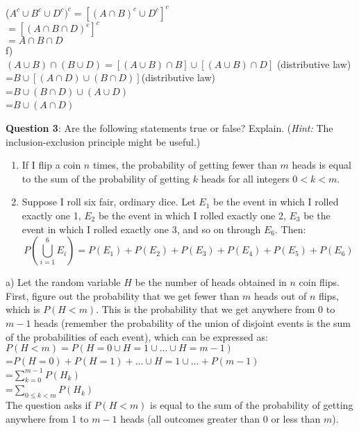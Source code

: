 \documentclass[12pt]{article}
\begin{document}
($A^c \cup B^c \cup D^c)^c = [(A \cap B)^c \cup D^c]^c$\\
$= [(A \cap B \cap D)^c]^c$\\
$= A \cap B \cap D$\\

  f)\\
$(A \cup B) \cap(B \cup D)  = [(A \cup B) \cap B] \cup [(A \cup B) \cap D]$ (distributive law) \\
=$B \cup [(A \cap D) \cup (B\cap D)]$(distributive law) \\
=$B \cup (B \cap D) \cup (A\cup D)$ \\
=$B \cup (A \cap D)$ \\

\medskip

\noindent \textbf{Question 3}: Are the following statements true or false? Explain. (\textit{Hint:} The inclusion-exclusion principle might be useful.)
\begin{enumerate}
\item If I flip a coin $n$ times, the probability of getting fewer than $m$ heads is equal to the sum of the probability of getting $k$ heads for all integers $0 < k < m$.
\item Suppose I roll six fair, ordinary dice. Let $E_1$ be the event in which I rolled exactly one 1, $E_2$ be the event in which I rolled exactly one 2, $E_3$ be the event in which I rolled exactly one 3, and so on through $E_6$. Then: $$P\left( \bigcup_{i=1}^{6}E_{i} \right) = P(E_1)+P(E_2)+P(E_3)+P(E_4)+P(E_5)+P(E_6)$$
\end{enumerate}

\bigskip

a) Let the random variable $H$ be the number of heads obtained in $n$ coin flips. First, figure out the probability that we get fewer than $m$ heads out of $n$ flips, which is $P(H<m)$. This is the probability that we get anywhere from 0 to $m-1$ heads (remember the probability of the union of disjoint events is the sum of the probabilities of each event), which can be expressed as:\\

$P(H <m) = P(H = 0 \cup H=1 \cup \ldots \cup H = m-1)$\\
=$ P(H = 0) + P(H=1) + \ldots \cup H=1 \cup \ldots +  P( m-1)$\\
=$ \sum_{k=0}^{m-1} P(H_k) $\\
=$ \sum_{0 \leq k < m} P(H_k) $\\

The question asks if $P(H<m)$ is equal to the sum of the probability of getting anywhere from 1 to $m-1$ heads (all outcomes greater than 0 or less than $m$).
\end{document}
